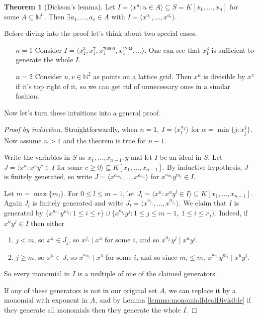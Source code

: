 \documentclass[a4paper]{article}
\theoremstyle{definition}
\newtheorem{thm}[defn]{Theorem}
\begin{document}
\begin{thm}[Dickson's lemma]
Let $I=\langle x^u:u\in A\rangle \subseteq S=K[x_1,\ldots,x_n]$ for some $A\subseteq \mathbb N^n$. Then $\exists a_1,\ldots,a_s\in A$ with $I=\langle x^{a_1},\ldots,x^{a_s} \rangle$.
\end{thm}
Before diving into the proof let's think about two special cases.
\begin{itemize}
\item[$n=1$] Consider $I=\langle x_1^3,x_1^7,x_1^{70000},x_1^{1234},\ldots\rangle$. One can see that $x_1^3$ is sufficient to generate the whole $I$.
\item[$n=2$] Consider $u,v\in\mathbb N^2$ as points on a lattice grid. Then $x^u$ is divisible by $x^v$ if it's top right of it, so we can get rid of unnecessary ones in a similar fashion.
\end{itemize}
Now let's turn these intuitions into a general proof.
\begin{proof}[Proof by induction]
Straightforwardly, when $n=1,\ I=\langle x_1^{\alpha_1}\rangle$ for $\alpha=\min \{j:x_j^I \}$. Now assume $n>1$ and the theorem is true for $n-1$.

Write the variables in $S$ as $x_1,\ldots,x_{n-1},y$ and let $I$ be an ideal in $S$. Let $J=\langle x^u:x^uy^c\in I\text{ for some }c\geq 0\rangle\subseteq K[x_1,\ldots,x_{n-1}]$. By inductive hypothesis, $J$ is finitely generated, so write $J=\langle x^{a_{m_1}}, \ldots, x^{a_{m_r}}\rangle $ for $x^{a_{m_i}}y^{m_i}\in I$.

Let $m=\max \{m_i\}$. For $0\leq l\leq m-1$, let $J_l=\langle x^u:x^u y^l\in I\rangle\subseteq K[x_1,\ldots,x_{n-1}]$. Again $J_l$ is finitely generated and write $J_l=\langle x^{a_{j_1}},\ldots,x^{a_{j_{r_l}}}\rangle$. We claim that $I$ is generated by $\{x^{a_{m_i}} y^{m_i}:1\leq i\leq r\} \cup \{x^{a_{j_i}}y^{j} : 1\leq j\leq m-1,\ 1\leq i\leq r_j\}$. Indeed, if $x^u y^j\in I$ then either
\begin{enumerate}
\item $j<m$, so $x^u\in J_j$, so  $x^{j_i} \mid x^u$ for some $i$, and so $x^{a_{j_i}} y^j\mid x^u y^j$.
\item $j\geq m$, so $x^u\in J$, so $x^{a_{m_i}} \mid x^u$ for some $i$, and so since $m_i\leq m,\ x^{a_{m_i}} y^{m_i}\mid x^u y^j$.
\end{enumerate}
So every monomial in $I$ is a multiple of one of the claimed generators.

If any of these generators is not in our original set $A$, we can replace it by a monomial with exponent in $A$, and by Lemma \ref{lemma:monomialIdealDivisible} if they generate all monomials then they generate the whole $I$.
\end{proof}
\end{document}
